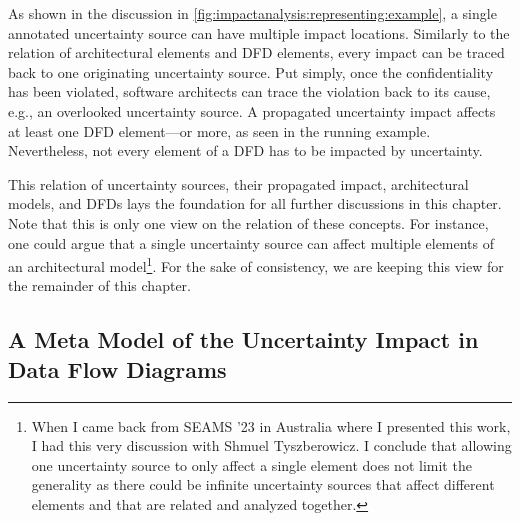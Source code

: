 As shown in the discussion in \autoref{fig:impactanalysis:representing:example}, a single annotated uncertainty source can have multiple impact locations.
Similarly to the relation of architectural elements and \ac{DFD} elements, every impact can be traced back to one originating uncertainty source.
Put simply, once the confidentiality has been violated, software architects can trace the violation back to its cause, e.g., an overlooked uncertainty source.
A propagated uncertainty impact affects at least one \ac{DFD} element---or more, as seen in the running example.
Nevertheless, not every element of a \ac{DFD} has to be impacted by uncertainty.

This relation of uncertainty sources, their propagated impact, architectural models, and \acp{DFD} lays the foundation for all further discussions in this chapter.
Note that this is only one view on the relation of these concepts.
For instance, one could argue that a single uncertainty source can affect multiple elements of an architectural model\footnote{When I came back from SEAMS '23 in Australia where I presented this work, I had this very discussion with Shmuel Tyszberowicz. I conclude that allowing one uncertainty source to only affect a single element does not limit the generality as there could be infinite uncertainty sources that affect different elements and that are related and analyzed together.}.
For the sake of consistency, we are keeping this view for the remainder of this chapter. 



\subsection{A Meta Model of the Uncertainty Impact in Data Flow Diagrams}

